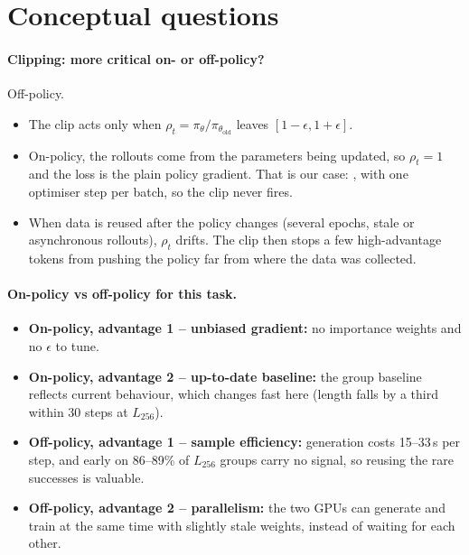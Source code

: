 \documentclass[10.5pt]{article}
\begin{document}
\section{Conceptual questions}
\paragraph{Clipping: more critical on- or off-policy?} Off-policy.
\begin{itemize}
\item The clip acts only when $\rho_t=\pi_\theta/\pi_{\theta_\text{old}}$ leaves $[1-\epsilon,1+\epsilon]$.
\item On-policy, the rollouts come from the parameters being updated, so $\rho_t=1$ and the loss is the plain policy
  gradient. That is our case: , with one optimiser step per batch, so
  the clip never fires.
\item When data is reused after the policy changes (several epochs, stale or asynchronous rollouts), $\rho_t$ drifts. The
  clip then stops a few high-advantage tokens from pushing the policy far from where the data was collected.
\end{itemize}

\paragraph{On-policy vs off-policy for this task.}
\begin{itemize}
\item \textbf{On-policy, advantage 1 -- unbiased gradient:} no importance weights and no $\epsilon$ to tune.
\item \textbf{On-policy, advantage 2 -- up-to-date baseline:} the group baseline reflects current behaviour, which changes
  fast here (length falls by a third within 30 steps at $L_{256}$).
\item \textbf{Off-policy, advantage 1 -- sample efficiency:} generation costs 15--33\,s per step, and early on 86--89\% of
  $L_{256}$ groups carry no signal, so reusing the rare successes is valuable.
\item \textbf{Off-policy, advantage 2 -- parallelism:} the two GPUs can generate and train at the same time with slightly
  stale weights, instead of waiting for each other.
\end{itemize}
\end{document}

